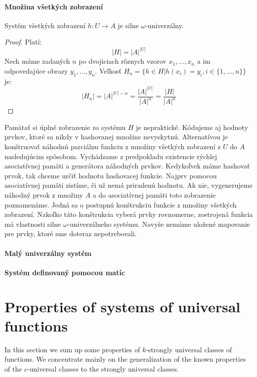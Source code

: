\paragraph{Množina všetkých zobrazení}
\begin{remark}
Systém všetkých zobrazení $h: U \rightarrow A$ je silne $\omega$-univerzálny.
\end{remark}
\begin{proof}
Platí:
\begin{displaymath}
|H| = {|A|}^{|U|}
\end{displaymath}
Nech máme zadaných $n$ po dvojiciach rôznych vzorov $x_1, \dots, x_n$ a im odpovedajúce obrazy $y_1, \dots, y_n$. Veľkosť $H_n = \lbrace h \in H | h(x_i) = y_i, i \in \lbrace 1, \dots, n \rbrace \rbrace$ je:
\begin{displaymath}
|H_n| = {|A|}^{|U| - n} = \frac{{|A|}^{|U|}}{{|A|}^{n}} = \frac{|H|}{|A|^n}
\end{displaymath}
\end{proof}

Pamätať si úplné zobrazenie zo systému $H$ je nepraktické. Kódujeme aj hodnoty prvkov, ktoré sa nikdy v hashovanej množine nevyskytnú. Alternatívou je konštruovať náhodnú parciálnu funkciu z množiny všetkých zobrazení z $U$ do $A$ nasledujúcim spôsobom. Vychádzame z predpokladu existencie rýchlej asociatívnej pamäti a generátora náhodných prvkov. Kedykoľvek máme hashovať prvok, tak chceme určiť hodnotu hashovacej funkcie. Najprv pomocou asociatívnej pamäti zistíme, či už nemá priradenú hodnotu. Ak nie, vygenerujeme náhodný prvok z množiny $A$ a do asociatívnej pamäti toto zobrazenie poznamenáme. Jedná sa o postupnú konštrukciu funkcie z množiny všetkých zobrazení. Nakoľko táto konštrukcia vyberá prvky rovnomerne, zostrojená funkcia má vlastnosti silne $\omega$-univerzálneho systému. Navyše nemáme uložené mapovanie pre prvky, ktoré sme doteraz nepotrebovali.

\paragraph{Malý univerzálny systém}


\paragraph{Systém definovaný pomocou matíc}

\section{Properties of systems of universal functions}
In this section we sum up some properties of $k$-strongly universal classes of functions. We concentrate mainly on the generalization of the known properties of the $c$-universal classes to the strongly universal classes.

